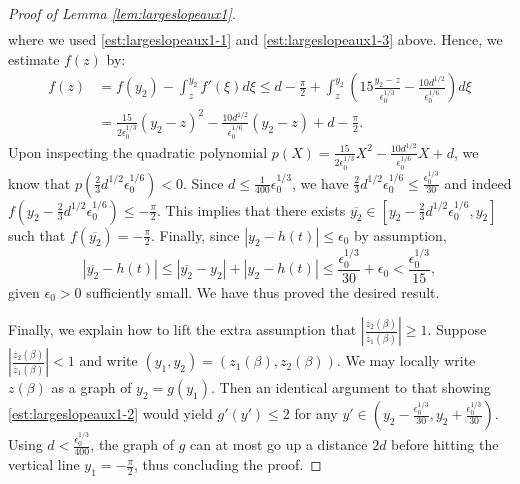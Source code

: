 \documentclass[11pt]{article}
\numberwithin{equation}{section}
\newcommand{\eps}{\epsilon}
\begin{document}
\begin{proof}[Proof of Lemma \ref{lem:largeslopeaux1}]
\begin{align*}
    \end{align*}
    where we used \eqref{est:largeslopeaux1-1} and \eqref{est:largeslopeaux1-3} above. Hence, we estimate $f(z)$ by:
    \begin{align*}
        f(z) &= f(y_2) - \int_z^{y_2} f'(\xi) d\xi \le d - \frac{\pi}{2}+\int_z^{y_2} \left(15\frac{y_2 - z}{\eps_0^{1/3}} - \frac{10d^{1/2}}{\eps_0^{1/6}}\right) d\xi\\
        &= \frac{15}{2\eps_0^{1/3}}(y_2 - z)^2 - \frac{10d^{1/2}}{\eps_0^{1/6}}(y_2 - z) + d - \frac{\pi}{2}.
    \end{align*}
    Upon inspecting the quadratic polynomial $p(X) = \frac{15}{2\eps_0^{1/3}}X^2 - \frac{10d^{1/2}}{\eps_0^{1/6}}X + d$, we know that $p(\frac{2}{3}d^{1/2}\eps_0^{1/6}) < 0$. Since $d \le \frac{1}{400}\eps_0^{1/3}$, we have $\frac{2}{3}d^{1/2}\eps_0^{1/6} \le \frac{\eps_0^{1/3}}{30}$ and indeed $f(y_2 - \frac{2}{3}d^{1/2}\eps_0^{1/6}) \le -\frac{\pi}{2}$. This implies that there exists $\overline{y_2} \in [y_2 - \frac{2}{3}d^{1/2}\eps_0^{1/6}, y_2]$ such that $f(\overline{y_2}) = -\frac{\pi}{2}$. Finally, since $|y_2 - h(t)| \le \eps_0$ by assumption, 
    \[
    |\overline{y_2} - h(t)| \le |\overline{y_2} - y_2| + |y_2 - h(t)| \le \frac{\eps_0^{1/3}}{30} + \eps_0 < \frac{\eps_0^{1/3}}{15},
    \]
    given $\eps_0 > 0$ sufficiently small. We have thus proved the desired result.

    Finally, we explain how to lift the extra assumption that $\left|\frac{\dot{z_2}(\beta)}{\dot{z_1}(\beta)}\right| \ge 1$. Suppose $\left|\frac{\dot{z_2}(\beta)}{\dot{z_1}(\beta)}\right| < 1$ and write $(y_1, y_2) = (z_1(\beta), z_2(\beta))$. We may locally write $z(\beta)$ as a graph of $y_2 = g(y_1)$. Then an identical argument to that showing \eqref{est:largeslopeaux1-2} would yield $g'(y') \le 2$ for any $y' \in (y_2 - \frac{\eps_0^{1/3}}{30}, y_2 + \frac{\eps_0^{1/3}}{30})$. Using $d<\frac{\eps_0^{1/3}}{400}$, the graph of $g$ can at most go up a distance $2d$ before hitting the vertical line $y_1=-\frac{\pi}{2}$, thus concluding the proof.
\end{proof}
\end{document}
